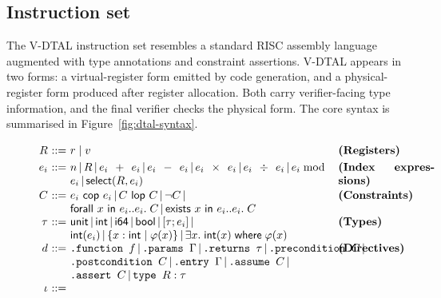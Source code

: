 \subsection{Instruction set}\label{sec:dtal-instr-set}

The V-DTAL instruction set resembles a standard RISC assembly language augmented with type annotations and constraint assertions. V-DTAL appears in two forms: a virtual-register form emitted by code generation, and a physical-register form produced after register allocation. Both carry verifier-facing type information, and the final verifier checks the physical form. The core syntax is summarised in Figure~\ref{fig:dtal-syntax}.

\begin{figure}[H]
{\small
\[
\renewcommand{\arraystretch}{1.09}
\begin{array}{@{}r@{\ }c@{\ }l@{\hspace{1.2em}}p{0.25\textwidth}@{}}
  R & ::= &
  r \mid v
  & \textbf{(Registers)} \\[2pt]
  e_i & ::= &
  \parbox[t]{0.66\textwidth}{
    $n \,|\, R \,|\, e_i + e_i \,|\, e_i - e_i \,|\, e_i \times e_i \,|\, e_i \div e_i \,|\, e_i \bmod e_i \,|\, \textsf{select}(R, e_i)$
  }
  & \textbf{(Index expressions)} \\[4pt]
  C & ::= &
  \parbox[t]{0.66\textwidth}{
    $e_i \textsf{ cop } e_i \,|\, C \textsf{ lop } C \,|\, \neg C \,|\, {}$\\
    $\textsf{forall } x \textsf{ in } e_i..e_i.\; C \,|\, \textsf{exists } x \textsf{ in } e_i..e_i.\; C$
  }
  & \textbf{(Constraints)} \\[4pt]
  \tau & ::= &
  \parbox[t]{0.66\textwidth}{
    $\textsf{unit} \,|\, \textsf{int} \,|\, \textsf{i64} \,|\, \textsf{bool} \,|\, [\tau; e_i] \,|\, {}$\\
    $\textsf{int}(e_i) \,|\, \{x:\textsf{int} \mid \varphi(x)\} \,|\, \exists x.\; \textsf{int}(x)\; \textsf{where}\; \varphi(x)$
  }
  & \textbf{(Types)} \\[4pt]
  d & ::= &
  \parbox[t]{0.66\textwidth}{
    $\texttt{.function } f \,|\, \texttt{.params } \Gamma \,|\, \texttt{.returns } \tau \,|\, \texttt{.precondition } C \,|\, {}$\\
    $\texttt{.postcondition } C \,|\, \texttt{.entry } \Gamma \,|\, \texttt{.assume } C \,|\, {}$\\
    $\texttt{.assert } C \,|\, \texttt{type } R : \tau$
  }
  & \textbf{(Directives)} \\[4pt]
  \iota & ::= &
  \parbox[t]{0.66\textwidth}{
}
\end{array}\]}
\end{figure}
